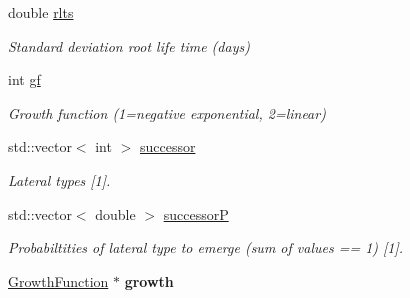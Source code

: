 \begin{DoxyCompactItemize}
double \hyperlink{classCPlantBox_1_1RootRandomOrganParameter_aa1b3e5e603bf9e155aaa9cbf22cc9f20}{rlts}
\begin{DoxyCompactList}\small\item\em Standard deviation root life time (days) \end{DoxyCompactList}\item 
\mbox{\label{classCPlantBox_1_1RootRandomOrganParameter_a5aa0513e96b4f00c2de2999cc731ff17}} 
int \hyperlink{classCPlantBox_1_1RootRandomOrganParameter_a5aa0513e96b4f00c2de2999cc731ff17}{gf}
\begin{DoxyCompactList}\small\item\em Growth function (1=negative exponential, 2=linear) \end{DoxyCompactList}\item 
\mbox{\label{classCPlantBox_1_1RootRandomOrganParameter_a8642b8fedc376a9e9ed015301e211a77}} 
std\+::vector$<$ int $>$ \hyperlink{classCPlantBox_1_1RootRandomOrganParameter_a8642b8fedc376a9e9ed015301e211a77}{successor}
\begin{DoxyCompactList}\small\item\em Lateral types \mbox{[}1\mbox{]}. \end{DoxyCompactList}\item 
\mbox{\label{classCPlantBox_1_1RootRandomOrganParameter_ae8e20f247f51329e52a81d3cdeaaeed4}} 
std\+::vector$<$ double $>$ \hyperlink{classCPlantBox_1_1RootRandomOrganParameter_ae8e20f247f51329e52a81d3cdeaaeed4}{successorP}
\begin{DoxyCompactList}\small\item\em Probabiltities of lateral type to emerge (sum of values == 1) \mbox{[}1\mbox{]}. \end{DoxyCompactList}\item 
\mbox{\label{classCPlantBox_1_1RootRandomOrganParameter_a29d8fd4d9ee23a194c74ec3698c8c951}} 
\hyperlink{classCPlantBox_1_1GrowthFunction}{Growth\+Function} $\ast$ {\bfseries growth}
\item 
\mbox{\label{classCPlantBox_1_1RootRandomOrganParameter_a8266c3b8ec00ac03719a9dcf1d04ad28}} 

\end{DoxyCompactItemize}
